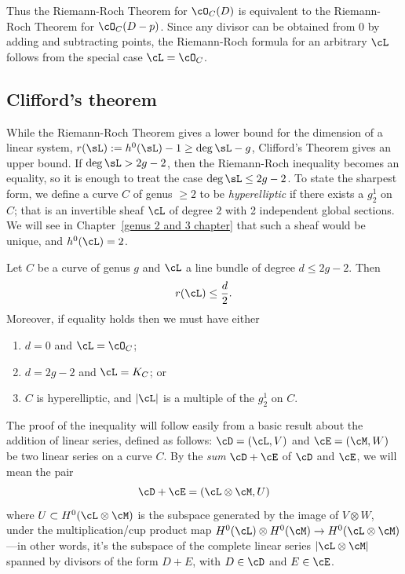 Thus the Riemann-Roch Theorem for $\cO_C(D)$ is equivalent to the Riemann-Roch Theorem for $\cO_C(D-p)$. Since any divisor can be obtained from 0 by adding and subtracting points, the Riemann-Roch formula for an arbitrary $\cL$ follows from the special case $\cL = \cO_C$.

\subsection{Clifford's theorem}

While the Riemann-Roch Theorem gives a lower bound for the dimension of a linear system, $r(\sL) := h^0(\sL)-1 \geq \deg \sL -g$, Clifford's Theorem
gives an upper bound. If $\deg \sL>2g-2$, then the Riemann-Roch inequality becomes an equality, so it is enough to treat the case $\deg \sL \leq 2g-2$.
To state the sharpest form, we define a curve $C$ of genus $\geq 2$ to be \emph{hyperelliptic} if there exists a $g^1_2$ on $C$; that is an
invertible sheaf $\cL$ of degree $2$ with 2 independent global sections. We will see in Chapter~\ref{genus 2 and 3 chapter} that such a sheaf would be unique, and $h^0(\cL) = 2$.


\begin{theorem}\label{Clifford}
Let $C$ be a curve of genus $g$ and $\cL$ a line bundle of degree $d \leq 2g-2$. Then
$$
r(\cL) \leq \frac{d}{2}.
$$
Moreover, if  equality holds then we must have either
\begin{enumerate}
\item $d=0$ and $\cL = \cO_C$;
\item $d = 2g-2$ and $\cL = K_C$; or
\item $C$ is hyperelliptic, and $|\cL|$ is a multiple of the $g^1_2$ on $C$.
\end{enumerate}
\end{theorem}

The proof of the inequality will follow easily from a basic result about the addition of linear series, defined as follows:
$\cD = (\cL,V)$ and $\cE = (\cM, W)$ be two linear series on a curve $C$. By the \emph{sum} $\cD + \cE$ of $\cD$ and $\cE$, we will mean the pair 
$$
\cD + \cE = (\cL \otimes \cM, U) 
$$
where $U \subset H^0(\cL \otimes \cM)$ is the subspace generated by the image of $V \otimes W$, under the multiplication/cup product map $H^0(\cL) \otimes H^0(\cM) \to H^0(\cL \otimes \cM)$---in other words, it's the subspace of the complete linear series $|\cL\otimes \cM|$ spanned by divisors of the form $D+E$, with $D \in \cD$ and $E \in \cE$.
 
